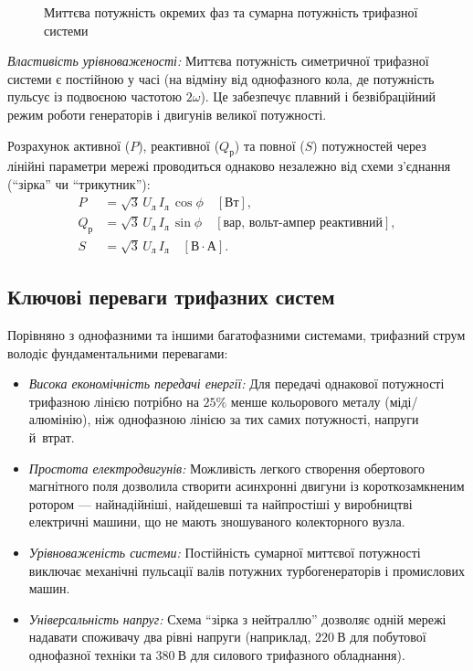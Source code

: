 \begin{figure}[h!]
	\centering
	\caption{Миттєва потужність окремих фаз та сумарна потужність трифазної системи}
	\label{pic:ThreePhasePower}
\end{figure}

\emph{Властивість урівноваженості:} Миттєва потужність симетричної трифазної системи є постійною у часі (на відміну від однофазного кола, де потужність пульсує із подвоєною частотою $2\omega$). Це забезпечує плавний і безвібраційний режим роботи генераторів і двигунів великої потужності.

Розрахунок активної ($P$), реактивної ($Q_\text{р}$) та повної ($S$) потужностей через лінійні параметри мережі проводиться однаково незалежно від схеми з'єднання (\enquote{зірка} чи \enquote{трикутник}):
\begin{align}
	P &= \sqrt{3} \, U_\text{л} \, I_\text{л} \, \cos\phi \quad [\text{Вт}], \\
	Q_\text{р} &= \sqrt{3} \, U_\text{л} \, I_\text{л} \, \sin\phi \quad [\text{вар, вольт-ампер реактивний} ], \\
	S &= \sqrt{3} \, U_\text{л} \, I_\text{л} \quad [\text{В}\cdot\text{А}].
\end{align}

\subsection*{Ключові переваги трифазних систем}

Порівняно з однофазними та іншими багатофазними системами, трифазний струм володіє фундаментальними перевагами:
\begin{itemize}
    \item \emph{Висока економічність передачі енергії:} Для передачі однакової потужності трифазною лінією потрібно на $25\%$ менше кольорового металу (міді/алюмінію), ніж однофазною лінією за тих самих потужності, напруги й~втрат.
    \item \emph{Простота електродвигунів:} Можливість легкого створення обертового магнітного поля дозволила створити асинхронні двигуни із короткозамкненим ротором --- найнадійніші, найдешевші та найпростіші у виробництві електричні машини, що не мають зношуваного колекторного вузла.
    \item \emph{Урівноваженість системи:} Постійність сумарної миттєвої потужності виключає механічні пульсації валів потужних турбогенераторів і промислових машин.
    \item \emph{Універсальність напруг:} Схема \enquote{зірка з нейтраллю} дозволяє одній мережі надавати споживачу два рівні напруги (наприклад, $220~\text{В}$ для побутової однофазної техніки та $380~\text{В}$ для силового трифазного обладнання).
\end{itemize}


